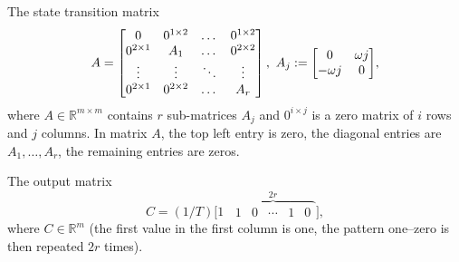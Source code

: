 \documentclass[letterpaper,10pt,conference,twoside]{IEEEtran}
\theoremstyle{definition}
\begin{document}
The state transition matrix
\begin{equation}\label{eq:mat_A}{\small
  A=\begin{bmatrix}
    0            & 0^{1\times 2}& \dots & 0^{1\times 2} \\
    0^{2\times 1}& A_1          & \dots & 0^{2\times 2} \\
    \vdots       & \vdots       & \ddots& \vdots        \\
    0^{2\times 1}& 0^{2\times 2}& \dots & A_r 
  \end{bmatrix},\,\,A_j:=\begin{bmatrix}0 & \omega j \\ -\omega j & 0\end{bmatrix}},
\end{equation}
where $A\in\mathbb{R}^{m\times m}$ contains $r$ sub-matrices $A_j$ and $0^{i\times j}$ is a zero matrix of $i$ rows and $j$ columns. In matrix $A$, the top left entry is zero, the diagonal entries are $A_1,\dots,A_r$, the remaining entries are zeros.

The output matrix\vspace*{-3ex}
\begin{equation}\label{eq:mat_C}
  C=(1/T)\Big[1 \,\,\, \overbrace{\begin{matrix}1 & 0 &\cdots & 1 & 0\end{matrix}}^{2r}\Big],
\end{equation}
where $C\in\mathbb{R}^m$ (the first value in the first column is one, the pattern one--zero is then repeated $2r$ times).


\end{document}
